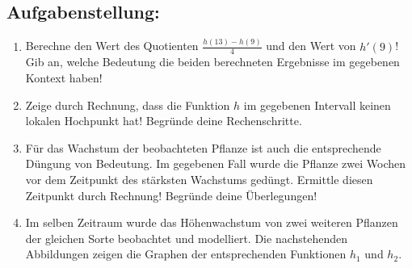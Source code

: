\begin{langesbeispiel}
\subsection{Aufgabenstellung:}

\begin{enumerate}
	\item Berechne den Wert des Quotienten $\frac{h(13)-h(9)}{4}$ und den Wert von $h'(9)$! Gib an, welche Bedeutung die beiden berechneten Ergebnisse im gegebenen Kontext haben!
	
	\item Zeige durch Rechnung, dass die Funktion $h$ im gegebenen Intervall keinen lokalen Hochpunkt hat! Begründe deine Rechenschritte.
	
	\item Für das Wachstum der beobachteten Pflanze ist auch die entsprechende Düngung von Bedeutung. Im gegebenen Fall wurde die Pflanze zwei Wochen vor dem Zeitpunkt des stärksten Wachstums gedüngt. Ermittle diesen Zeitpunkt durch Rechnung! Begründe deine Überlegungen!
	
	\item Im selben Zeitraum wurde das Höhenwachstum von zwei weiteren Pflanzen der gleichen Sorte beobachtet und modelliert. Die nachstehenden Abbildungen zeigen die Graphen der
entsprechenden Funktionen $h_1$ und $h_2$.


\end{enumerate}
\end{langesbeispiel}
